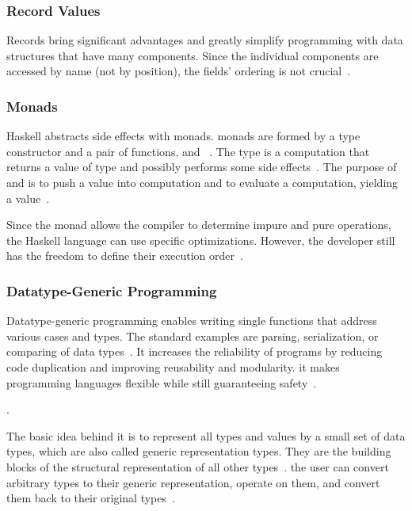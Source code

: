 \begin{frame}\frametitle{Record Values}

Records bring significant advantages and greatly simplify programming with data structures that have many components. Since the individual components are accessed by name (not by position), the fields' ordering is not crucial~\cite{lw-ext-records}.


\end{frame}

\begin{frame}\frametitle{Monads}

Haskell abstracts side effects with monads. monads are formed by a type constructor  and a pair of functions,  and \expr{>>=}~\cite{history-of-haskell,essence-of-fp}. The type  is a computation that returns a value of type  and possibly performs some side effects~\cite{history-of-haskell}. The purpose of  and \expr{>>=} is to push a value into computation and to evaluate a computation, yielding a value~\cite{essence-of-fp}.

Since the monad allows the compiler to determine impure and pure operations, the Haskell language can use specific optimizations. However, the developer still has the freedom to define their execution order~\cite{history-of-haskell}.

\end{frame}

\begin{frame}\frametitle{Datatype-Generic Programming}
    
Datatype-generic programming enables writing single functions that address various cases and types. The standard examples are parsing,  serialization, or comparing of data types~\cite{derivable-type-classes}. It increases the reliability of programs by reducing code duplication and improving reusability and modularity. it makes programming languages flexible while still guaranteeing safety~\cite{datatype-generic-programming,optimizing-generics}.
  
. 
    
The basic idea behind it is to represent all types and values by a small set of data types, which are also called generic representation types. They are the building blocks of the structural representation of all other types~\cite{optimizing-generics}. the user can convert arbitrary types to their generic representation, operate on them, and convert them back to their original types~\cite{optimizing-generics,history-of-haskell, ghc-generics}.

\end{frame}